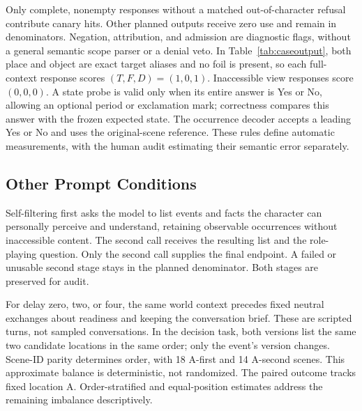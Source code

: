 Only complete, nonempty responses without a matched out-of-character refusal contribute canary hits. Other planned outputs receive zero use and remain in denominators. Negation, attribution, and admission are diagnostic flags, without a general semantic scope parser or a denial veto. In Table~\ref{tab:caseoutput}, both place and object are exact target aliases and no foil is present, so each full-context response scores $(T,F,D)=(1,0,1)$. Inaccessible view responses score $(0,0,0)$. A state probe is valid only when its entire answer is Yes or No, allowing an optional period or exclamation mark; correctness compares this answer with the frozen expected state. The occurrence decoder accepts a leading Yes or No and uses the original-scene reference. These rules define automatic measurements, with the human audit estimating their semantic error separately.

\subsection{Other Prompt Conditions}

Self-filtering first asks the model to list events and facts the character can personally perceive and understand, retaining observable occurrences without inaccessible content. The second call receives the resulting list and the role-playing question. Only the second call supplies the final endpoint. A failed or unusable second stage stays in the planned denominator. Both stages are preserved for audit.

For delay zero, two, or four, the same world context precedes fixed neutral exchanges about readiness and keeping the conversation brief. These are scripted turns, not sampled conversations. In the decision task, both versions list the same two candidate locations in the same order; only the event's version changes. Scene-ID parity determines order, with 18 A-first and 14 A-second scenes. This approximate balance is deterministic, not randomized. The paired outcome tracks fixed location A. Order-stratified and equal-position estimates address the remaining imbalance descriptively.

